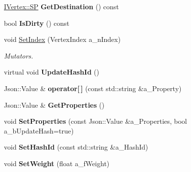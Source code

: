 \begin{DoxyCompactItemize}
\mbox{\label{class_i_graph_1_1_i_edge_a840654ed92e088bcfb4cb8453a0140e5}} 
\hyperlink{class_i_graph_1_1_i_vertex_af72b9df91f110bc7824c608c10cc819c}{I\+Vertex\+::\+SP} {\bfseries Get\+Destination} () const
\item 
\mbox{\label{class_i_graph_1_1_i_edge_a8279a583dc5213960bc1c4396e009126}} 
bool {\bfseries Is\+Dirty} () const
\item 
\mbox{\label{class_i_graph_1_1_i_edge_a270031dafb84401d51d059aefca98ff1}} 
void \hyperlink{class_i_graph_1_1_i_edge_a270031dafb84401d51d059aefca98ff1}{Set\+Index} (Vertex\+Index a\+\_\+n\+Index)
\begin{DoxyCompactList}\small\item\em Mutators. \end{DoxyCompactList}\item 
\mbox{\label{class_i_graph_1_1_i_edge_ab706a9961a7867082ac999760cdb35d8}} 
virtual void {\bfseries Update\+Hash\+Id} ()
\item 
\mbox{\label{class_i_graph_1_1_i_edge_a445fff49be2eb58cfb6e05e4e9b03c0b}} 
Json\+::\+Value \& {\bfseries operator\mbox{[}$\,$\mbox{]}} (const std\+::string \&a\+\_\+\+Property)
\item 
\mbox{\label{class_i_graph_1_1_i_edge_a87f0f578ab07d48a7161445c41fef47f}} 
Json\+::\+Value \& {\bfseries Get\+Properties} ()
\item 
\mbox{\label{class_i_graph_1_1_i_edge_a0e1a79084c425e92587c81271cd9a445}} 
void {\bfseries Set\+Properties} (const Json\+::\+Value \&a\+\_\+\+Properties, bool a\+\_\+b\+Update\+Hash=true)
\item 
\mbox{\label{class_i_graph_1_1_i_edge_a855e545f56bb6d7e7f4cc2c97332e06e}} 
void {\bfseries Set\+Hash\+Id} (const std\+::string \&a\+\_\+\+Hash\+Id)
\item 
\mbox{\label{class_i_graph_1_1_i_edge_a766829b68109a95c3aa8c094280b0bdd}} 
void {\bfseries Set\+Weight} (float a\+\_\+f\+Weight)

\end{DoxyCompactItemize}
